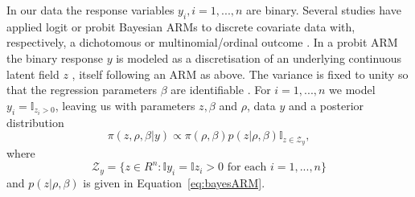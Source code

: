\documentclass{article}
\makeatletter
\newcommand{\distas}[1]{\mathbin{\overset{#1}{\kern\z@\sim}}}%
\makeatother
\begin{document}
 In our data the response variables $y_i, i=1,...,n$ are binary. Several studies have applied logit or probit Bayesian ARMs to discrete covariate data with, respectively, a dichotomous or multinomial/ordinal outcome \cites{holloway2002bayesian, lesage2011new, wilhelm2013estimating}. In a probit ARM the binary response $y$ is modeled as a discretisation of an underlying
continuous latent field $z$ \cite{albert1993bayesian}, itself following an ARM as above. The variance is fixed to unity so that the regression parameters
$\beta$ are identifiable \cite{lesage1999applied}.
For $i=1,...,n$ we model $y_i = \mathbb{I}_{z_i > 0} $, leaving us with parameters $z, \beta$ and $\rho$, data $y$ and a posterior distribution
\begin{equation}
\pi (z, \rho, \beta | y ) \propto \pi (\rho, \beta) p(z | \rho, \beta)\mathbb{I}_{z\in \mathcal{Z}_y},
\label{eq:distribution}
\end{equation}
where
\[
\mathcal{Z}_y=\{z\in R^n: \mathbb{I} y_i = \mathbb{I} z_i > 0 \mbox{\ for each\ } i=1,...,n\}
\]
and $p(z | \rho, \beta)$ is given in Equation~\ref{eq:bayesARM}.
%
%
\end{document}
